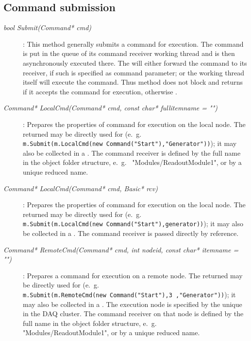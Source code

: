 \subsection{Command submission}	 
	
\begin{description}
 
\item[\em bool Submit\small (Command* cmd)] :
This method generally submits a command  for execution.
The command is put in the queue of its command receiver working thread and is
then asynchronously executed there. The  will either forward the command
to its receiver, if such is specified as command parameter; or the  working thread itself will execute the command.
Thus method does not block and returns  if it accepts the command for execution, otherwise . 
      
\item[\em Command* LocalCmd\small (Command* cmd, const char* fullitemname = "")] :
Prepares the properties of command  for execution on the local node. The
returned  may be directly used for 
(e.~g.~ \\ {\tt m.Submit(m.LocalCmd(new Command("Start"),"Generator"))});
it may also be collected in a .
The command receiver is defined by the full name  in the object folder structure, e.~g.~ "Modules/ReadoutModule1", or by a unique reduced name.

\item[\em Command* LocalCmd\small (Command* cmd, Basic* rcv)] :
Prepares the properties of command  for execution on the local node. The
returned  may be directly used for 
(e.~g.~ \\ {\tt m.Submit(m.LocalCmd(new Command("Start"),generator))});
it may also be collected in a .
The command receiver  is passed directly by reference.


\item[\em Command* RemoteCmd(Command* cmd, int nodeid, const char* itemname = "")] :
Prepares a command  for execution on a remote node. 
The returned  may be directly used for 
(e.~g.~ \\ {\tt m.Submit(m.RemoteCmd(new Command("Start"),3 ,"Generator"))});
it may also be collected in a .
The execution node is specified by the unique  in the DAQ
cluster. The command receiver on that node
is defined by the full name  in the object folder structure,
e.~g.~ "Modules/ReadoutModule1", or by a unique reduced name.



\end{description}
